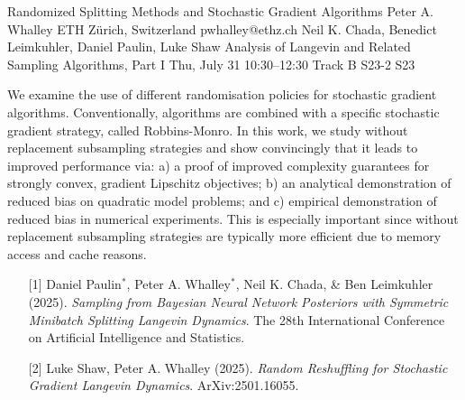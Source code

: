 \begin{talk}
  {Randomized Splitting Methods and Stochastic Gradient Algorithms}%
  {Peter A. Whalley}%
  {ETH Z\"{u}rich, Switzerland}%
  {pwhalley@ethz.ch}%
  {Neil K. Chada, Benedict Leimkuhler, Daniel Paulin, Luke Shaw}%
  {Analysis of Langevin and Related Sampling Algorithms, Part I}%
  {Thu, July 31 10:30–12:30 Track B}%
  {S23-2}%
  {S23}%
				
			
We examine the use of different randomisation policies for stochastic gradient algorithms. Conventionally, algorithms are combined with a specific stochastic gradient strategy, called Robbins-Monro. In this work, we study without replacement subsampling strategies and show convincingly that it leads to improved performance via: a) a proof of improved complexity guarantees for strongly convex, gradient Lipschitz objectives;
b) an analytical demonstration of reduced bias on quadratic model problems; and c) empirical
demonstration of reduced bias in numerical experiments. This is especially important since without replacement subsampling strategies are typically more efficient due to memory access and cache reasons. 

\medskip

\begin{enumerate}
	\item[{[1]}] Daniel Paulin$^{*}$, Peter A. Whalley$^{*}$, Neil K. Chada, \& Ben Leimkuhler (2025). {\it Sampling from Bayesian Neural Network Posteriors with Symmetric Minibatch Splitting Langevin Dynamics}. The 28th International Conference on Artificial Intelligence and Statistics.

        \item[{[2]}] Luke Shaw, Peter A. Whalley (2025). {\it Random Reshuffling for Stochastic Gradient Langevin Dynamics}. ArXiv:2501.16055.
\end{enumerate}

\end{talk}

